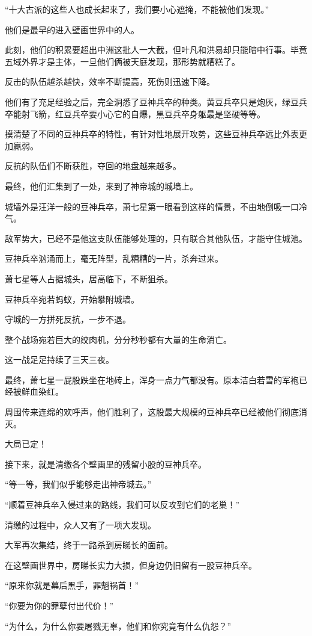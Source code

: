 \begin{this_body}
“十大古派的这些人也成长起来了，我们要小心遮掩，不能被他们发现。”

他们是最早的进入壁画世界中的人。

此刻，他们的积累要超出中洲这批人一大截，但叶凡和洪易却只能暗中行事。毕竟五域外界才是主体，一旦他们俩被天庭发现，那形势就糟糕了。

反击的队伍越杀越快，效率不断提高，死伤则迅速下降。

他们有了充足经验之后，完全洞悉了豆神兵卒的种类。黄豆兵卒只是炮灰，绿豆兵卒能射飞箭，红豆兵卒要小心它的自爆，黑豆兵卒身躯最是坚硬等等。

摸清楚了不同的豆神兵卒的特性，有针对性地展开攻势，这些豆神兵卒远比外表更加羸弱。

反抗的队伍们不断获胜，夺回的地盘越来越多。

最终，他们汇集到了一处，来到了神帝城的城墙上。

城墙外是汪洋一般的豆神兵卒，萧七星第一眼看到这样的情景，不由地倒吸一口冷气。

敌军势大，已经不是他这支队伍能够处理的，只有联合其他队伍，才能守住城池。

豆神兵卒汹涌而上，毫无阵型，乱糟糟的一片，杀奔过来。

萧七星等人占据城头，居高临下，不断狙杀。

豆神兵卒宛若蚂蚁，开始攀附城墙。

守城的一方拼死反抗，一步不退。

整个战场宛若巨大的绞肉机，分分秒秒都有大量的生命消亡。

这一战足足持续了三天三夜。

最终，萧七星一屁股跌坐在地砖上，浑身一点力气都没有。原本洁白若雪的军袍已经被鲜血染红。

周围传来连绵的欢呼声，他们胜利了，这股最大规模的豆神兵卒已经被他们彻底消灭。

大局已定！

接下来，就是清缴各个壁画里的残留小股的豆神兵卒。

“等一等，我们似乎能够走出神帝城去。”

“顺着豆神兵卒入侵过来的路线，我们可以反攻到它们的老巢！”

清缴的过程中，众人又有了一项大发现。

大军再次集结，终于一路杀到房睇长的面前。

在这壁画世界中，房睇长实力大损，但身边仍旧留有一股豆神兵卒。

“原来你就是幕后黑手，罪魁祸首！”

“你要为你的罪孽付出代价！”

“为什么，为什么你要屠戮无辜，他们和你究竟有什么仇怨？”


\end{this_body}
